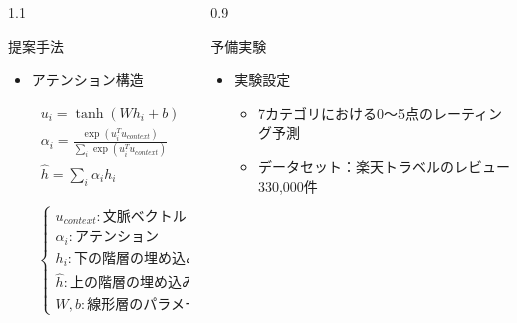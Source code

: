 \documentclass[unicode,10pt]{beamer}
\newlength{\mycolumnwidth}
\newcommand{\itemtitle}[1]{#1\\}
\begin{document}
\begin{frame}[t]
\begin{columns}[onlytextwidth,t]
\begin{column}{1.1\mycolumnwidth}
\begin{block}{提案手法}
\begin{figure}
      \end{figure}
      \begin{itemize}
        \item アテンション構造 \cite{yang16}
          {
            \large
            \hspace{-8em}
            \begin{minipage}[t]{0.4\linewidth}
              \begin{gather*}
                u_i = \tanh (W h_{i} + b) \\
                \alpha_i = \frac{\exp (u^T_i u_{context})}
                                {\sum_i \exp (u^T_i u_{context})} \\
                \hat{h} = \sum_i \alpha_i h_i
              \end{gather*}
            \end{minipage}
            \begin{minipage}[t]{0.1\linewidth}
              \begin{gather*}
                \begin{cases}
                  u_{context} : \text{文脈ベクトル} \\
                  \alpha_i : \text{アテンション} \\
                  h_i : \text{下の階層の埋め込み} \\
                  \hat{h} : \text{上の階層の埋め込み} \\
                  W, b : \text{線形層のパラメータ}
                \end{cases}
              \end{gather*}
            \end{minipage}
          }
      \end{itemize}
    \end{block}
  \end{column}

  \begin{column}{0.9\mycolumnwidth}
    \begin{block}{予備実験}
      \begin{itemize}
        \item \itemtitle{実験設定}
          \begin{itemize}
            \item 7カテゴリにおける0〜5点のレーティング予測
            \item データセット：楽天トラベルのレビュー330,000件
          \end{itemize}


\end{itemize}
\end{block}
\end{column}
\end{columns}
\end{frame}
\end{document}
